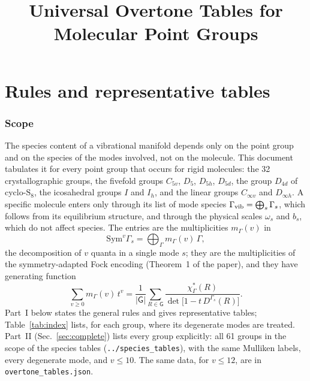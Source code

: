 \documentclass[11pt]{article}
\title{Universal Overtone Tables for Molecular Point Groups}
\author{}
\date{}
\begin{document}
\maketitle
\tableofcontents
\bigskip

\part{Rules and representative tables}

\section{Scope}

The species content of a vibrational manifold depends only on the point group and on the species of the modes involved, not on the molecule. This document tabulates it for every point group that occurs for rigid molecules: the 32 crystallographic groups, the fivefold groups $C_{5v}$, $D_5$, $D_{5h}$, $D_{5d}$, the group $D_{4d}$ of cyclo-$\mathrm S_8$, the icosahedral groups $I$ and $I_h$, and the linear groups $C_{\infty v}$ and $D_{\infty h}$. A specific molecule enters only through its list of mode species $\Gamma_{\rm vib}=\bigoplus_s\Gamma_s$, which follows from its equilibrium structure, and through the physical scales $\omega_s$ and $b_s$, which do not affect species. The entries are the multiplicities $m_\Gamma(v)$ in
\begin{equation}
\mathrm{Sym}^v\Gamma_s=\bigoplus_\Gamma m_\Gamma(v)\,\Gamma ,
\end{equation}
the decomposition of $v$ quanta in a single mode $s$; they are the multiplicities of the symmetry-adapted Fock encoding (Theorem~1 of the paper), and they have generating function
\begin{equation}
\sum_{v\ge0}m_\Gamma(v)\,t^v=\frac{1}{|\mathsf G|}\sum_{R\in\mathsf G}\frac{\chi^*_\Gamma(R)}{\det\bigl[1-t\,D^{\Gamma_s}(R)\bigr]} .
\label{eq:molien}
\end{equation}
Part~I below states the general rules and gives representative tables; Table~\ref{tab:index} lists, for each group, where its degenerate modes are treated. Part~II (Sec.~\ref{sec:complete}) lists every group explicitly: all 61 groups in the scope of the species tables (\texttt{../species\_tables}), with the same Mulliken labels, every degenerate mode, and $v\le10$. The same data, for $v\le12$, are in \texttt{overtone\_tables.json}.
\end{document}
